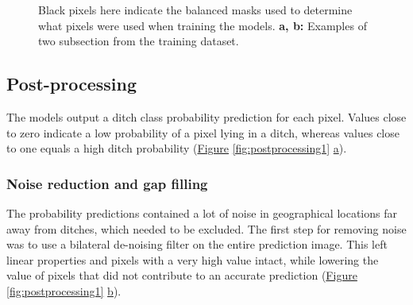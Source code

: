 \documentclass[]{interact}
\theoremstyle{plain}%
\theoremstyle{definition}
\theoremstyle{remark}
\begin{document}
\begin{figure} [!htb]
{        }
    \caption{Black pixels here indicate the balanced masks used to determine what pixels were used when training the models. \textbf{a, b: }Examples of two subsection from the training dataset.}
    \label{fig:balancedmasks}
\end{figure}

\subsection{Post-processing}
The models output a ditch class probability prediction for each pixel. Values close to zero indicate a low probability of a pixel lying in a ditch, whereas values close to one equals a high ditch probability (\hyperref[fig:postprocessing1]{Figure} \ref{fig:postprocessing1} \hyperref[fig:postprocessing1]{a}).

\subsubsection{Noise reduction and gap filling}
The probability predictions contained a lot of noise in geographical locations far away from ditches, which needed to be excluded. The first step for removing noise was to use a bilateral de-noising filter on the entire prediction image. This left linear properties and pixels with a very high value intact, while lowering the value of pixels that did not contribute to an accurate prediction (\hyperref[fig:postprocessing1]{Figure} \ref{fig:postprocessing1} \hyperref[fig:postprocessing1]{b}).
\end{document}
